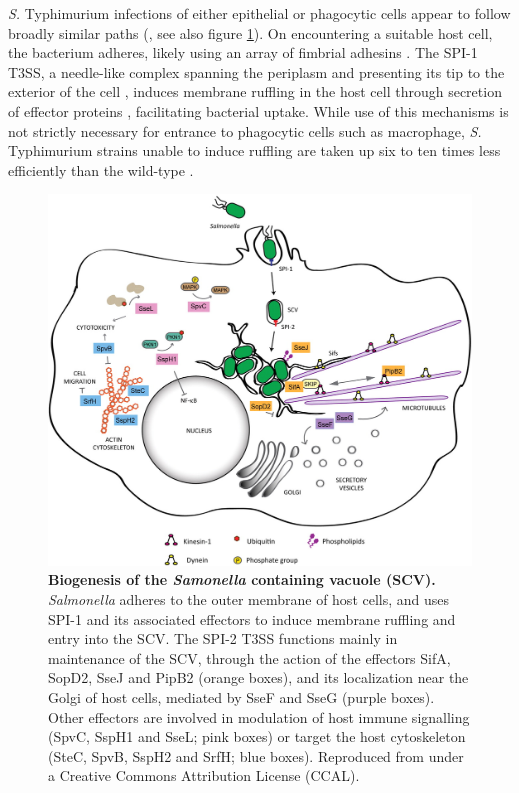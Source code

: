 \textit{S.} Typhimurium infections of either epithelial or phagocytic cells appear to follow broadly similar paths (\textcite{Figueira2012}, see also figure \ref{fig:SCV}). On encountering a suitable host cell, the bacterium adheres, likely using an array of fimbrial adhesins \parencite{Baumler1996a, Velden1998}. The SPI-1 T3SS, a needle-like complex spanning the periplasm and presenting its tip to the exterior of the cell \parencite{Mueller2008}, induces membrane ruffling in the host cell through secretion of effector proteins \parencite{Zhou2001}, facilitating bacterial uptake. While use of this mechanisms is not strictly necessary for entrance to phagocytic cells such as macrophage, {\it S.} Typhimurium strains unable to induce ruffling are taken up six to ten times less efficiently than the wild-type \parencite{Monack1996}.

\begin{figure}[htp]
\begin{center}
\includegraphics[width=14cm]{SCV.jpg}
\caption[Biogenesis of the \textit{Samonella} containing vacuole]{\textbf{Biogenesis of the \textit{Samonella} containing vacuole (SCV).} \textit{Salmonella} adheres to the outer membrane of host cells, and uses SPI-1 and its associated effectors to induce membrane ruffling and entry into the SCV. The SPI-2 T3SS functions mainly in maintenance of the SCV, through the action of the effectors SifA, SopD2, SseJ and PipB2 (orange boxes), and its localization near the Golgi of host cells, mediated by SseF and SseG (purple boxes). Other effectors are involved in modulation of host immune signalling (SpvC, SspH1 and SseL; pink boxes) or target the host cytoskeleton (SteC, SpvB, SspH2 and SrfH; blue boxes). Reproduced from \textcite{Figueira2012} under a Creative Commons Attribution License (CCAL). 
} 
\label{fig:SCV}
\end{center}
\end{figure}

